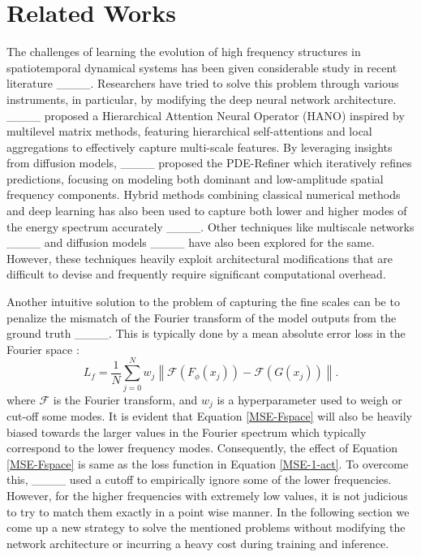 \section{Related Works}
The challenges of learning the evolution of high frequency structures in spatiotemporal dynamical systems has been given considerable study in recent literature ____. Researchers have tried to solve this problem through various instruments, in particular, by modifying the deep neural network architecture. ____ proposed a Hierarchical Attention Neural Operator (HANO) inspired by multilevel matrix methods, featuring hierarchical self-attentions and local aggregations to effectively capture multi-scale features. By leveraging insights from diffusion models, ____ proposed the PDE-Refiner which iteratively refines predictions, focusing on modeling both dominant and low-amplitude spatial frequency components. Hybrid methods combining classical numerical methods and deep learning has also been used to capture both lower and higher modes of the energy spectrum accurately ____. Other techniques like multiscale networks ____ and diffusion models ____ have also been explored for the same. However, these techniques heavily exploit architectural modifications that are difficult to devise and frequently require significant computational overhead. 

Another intuitive solution to the problem of capturing the fine scales can be to penalize the mismatch of the Fourier transform of the model outputs from the ground truth ____. This is typically done by a mean absolute error loss in the Fourier space :
\begin{equation}\label{MSE-Fspace}
L_f = \frac{1}{N}\sum_{j=0}^Nw_j \left\|\mathcal{F}(F_{\phi}(x_j)) - \mathcal{F}(G(x_j))\right\|.
\end{equation}
where $\mathcal{F}$ is the Fourier transform, and $w_j$ is a hyperparameter used to weigh or cut-off some modes. 
It is evident that Equation \ref{MSE-Fspace} will also be heavily biased towards the larger values in the Fourier spectrum which typically correspond to the lower frequency modes. Consequently, the effect of Equation \ref{MSE-Fspace} is same as the loss function in Equation \ref{MSE-1-act}. To overcome this, ____ used a cutoff to empirically ignore some of the lower frequencies. However, for the higher frequencies with extremely low values, it is not judicious to try to match them exactly in a point wise manner. In the following section we come up a new strategy to solve the mentioned problems without modifying the network architecture or incurring a heavy cost during training and inference.